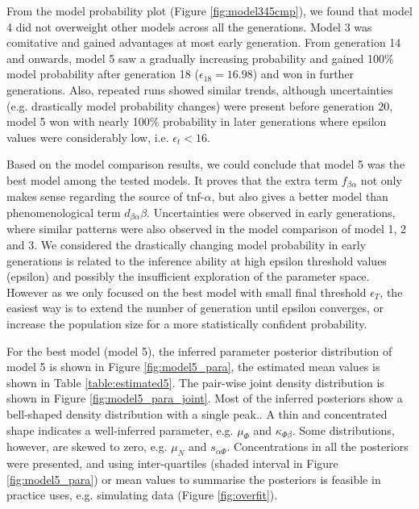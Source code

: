 From the model probability plot (Figure \ref{fig:model345cmp}), we found that model 4 did not overweight other models across all the generations. Model 3 was comitative and gained advantages at most early generation. From generation 14 and onwards, model 5 saw a gradually increasing probability and gained 100\% model probability after generation 18 ($\epsilon_{18} = 16.98$) and won in further generations. Also, repeated runs showed similar trends, although uncertainties (e.g. drastically model probability changes) were present before generation 20, model 5 won with nearly 100\% probability in later generations where epsilon values were considerably low, i.e. $\epsilon_t<16$.

Based on the model comparison results, we could conclude that model 5 was the best model among the tested models. 
It proves that the extra term $f_{\beta\alpha}$ not only makes sense regarding the source of tnf-$\alpha$, but also gives a better model than phenomenological term $d_{\beta\alpha}\beta$.
Uncertainties were observed in early generations, where similar patterns were also observed in the model comparison of model 1, 2 and 3. We considered the drastically changing model probability in early generations is related to the inference ability at high epsilon threshold values (epsilon) and possibly the insufficient exploration of the parameter space. However as we only focused on the best model with small final threshold $\epsilon_T$, the easiest way is to extend the number of generation until epsilon converges, or increase the population size for a more statistically confident probability.




For the best model (model 5), the inferred parameter posterior distribution of model 5 is shown in Figure \ref{fig:model5_para}, the estimated mean values is shown in Table \ref{table:estimated5}. The pair-wise joint density distribution is shown in Figure \ref{fig:model5_para_joint}. Most of the inferred posteriors show a bell-shaped density distribution with a single peak.. A thin and concentrated shape indicates a well-inferred parameter, e.g. $\mu_{\Phi}$ and $\kappa_{\Phi\beta}$. Some distributions, however, are skewed to zero, e.g. $\mu_N$ and $s_{\alpha\Phi}$. Concentrations in all the posteriors were presented, and using inter-quartiles (shaded interval in Figure \ref{fig:model5_para}) or mean values to summarise the posteriors is feasible in practice uses, e.g. simulating data (Figure \ref{fig:overfit}).


